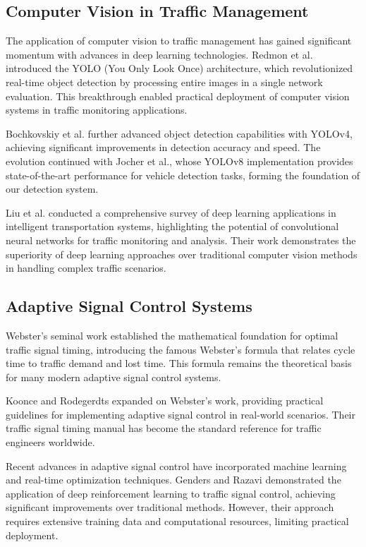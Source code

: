 \documentclass[conference]{IEEEtran}
\begin{document}
\subsection{Computer Vision in Traffic Management}

The application of computer vision to traffic management has gained significant momentum with advances in deep learning technologies. Redmon et al. introduced the YOLO (You Only Look Once) architecture, which revolutionized real-time object detection by processing entire images in a single network evaluation\cite{redmon2016you}. This breakthrough enabled practical deployment of computer vision systems in traffic monitoring applications.

Bochkovskiy et al. further advanced object detection capabilities with YOLOv4, achieving significant improvements in detection accuracy and speed\cite{bochkovskiy2020yolov4}. The evolution continued with Jocher et al., whose YOLOv8 implementation provides state-of-the-art performance for vehicle detection tasks, forming the foundation of our detection system\cite{jocher2023yolov8}.

Liu et al. conducted a comprehensive survey of deep learning applications in intelligent transportation systems, highlighting the potential of convolutional neural networks for traffic monitoring and analysis. Their work demonstrates the superiority of deep learning approaches over traditional computer vision methods in handling complex traffic scenarios\cite{liu2018deep}.

\subsection{Adaptive Signal Control Systems}

Webster's seminal work established the mathematical foundation for optimal traffic signal timing, introducing the famous Webster's formula that relates cycle time to traffic demand and lost time. This formula remains the theoretical basis for many modern adaptive signal control systems\cite{webster1958traffic}.

Koonce and Rodegerdts expanded on Webster's work, providing practical guidelines for implementing adaptive signal control in real-world scenarios. Their traffic signal timing manual has become the standard reference for traffic engineers worldwide\cite{koonce2008traffic}.

Recent advances in adaptive signal control have incorporated machine learning and real-time optimization techniques. Genders and Razavi demonstrated the application of deep reinforcement learning to traffic signal control, achieving significant improvements over traditional methods. However, their approach requires extensive training data and computational resources, limiting practical deployment.
\end{document}
